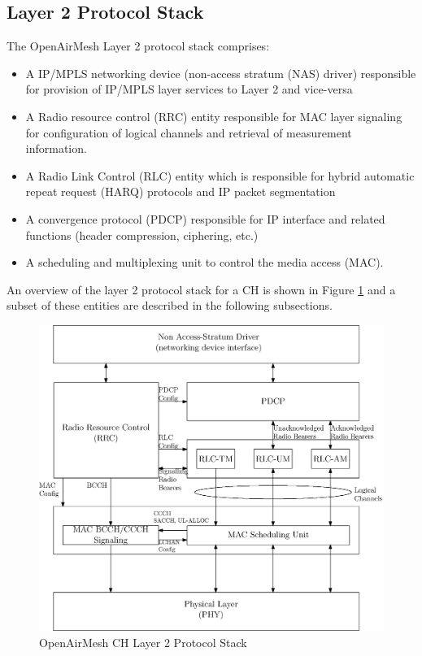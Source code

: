 \documentclass[a4paper,twocolumn,journal]{IEEEtran}
\begin{document}
 


\subsection{Layer 2 Protocol Stack}
\label{sec:mac}

The OpenAirMesh Layer 2 protocol stack comprises:
\begin{itemize}
\item  A IP/MPLS networking device (non-access stratum (NAS) driver) responsible for provision of IP/MPLS layer services to Layer 2 and vice-versa
\item  A Radio resource control (RRC) entity responsible for MAC layer signaling for configuration of logical channels and retrieval of measurement information.
\item A Radio Link Control (RLC) entity which is responsible for hybrid automatic repeat request (HARQ) protocols and IP packet segmentation
\item A convergence protocol (PDCP) responsible for IP interface and related functions (header compression, ciphering, etc.)
\item A scheduling and multiplexing unit to control the media access (MAC). 
\end{itemize}
An overview of the layer 2 protocol stack for a CH is shown in Figure \ref{fig:Layer2_stack} and a subset of these entities are described in the following subsections. 

\begin{figure}
 \includegraphics[width=\columnwidth]{figures/layer2_stack}
\caption{OpenAirMesh CH Layer 2 Protocol Stack}
\label{fig:Layer2_stack}
\end{figure}
\end{document}
